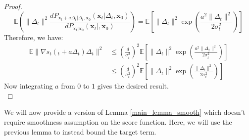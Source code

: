 \documentclass[11pt]{article}
\def\rvx{{\mathbf{x}}}
\begin{document}
\begin{proof}
\[
\mathbb{E}\left( \|\Delta_t\|^2\frac{d P_{\rvx_t+a\Delta_t|\Delta_t,\rvx_0}(\rvx_t|\Delta_t,\rvx_0)}{d P_{\rvx_t|\rvx_0}(\rvx_t|,\rvx_0)} \right) = \mathbb{E}\left[\|\Delta_t\|^2\exp\left(\frac{a^2\|\Delta_t\|^2}{2\sigma_t^2}\right)\right] 
\]
Therefore, we have:
\begin{align*}
\mathbb{E}\|\nabla s_t(_t+a\Delta_t)\Delta_t\|^2 &\leq \left(\frac{d}{\sigma_t^2}\right)^2 \mathbb{E}\left[\|\Delta_t\|^2\exp\left(\frac{a^2\|\Delta_t\|^2}{2\sigma_t^2}\right)\right]\\
& \leq \left(\frac{d}{\sigma_t^2}\right)^2 \mathbb{E}\left[\|\Delta_t\|^2\exp\left(\frac{\|\Delta_t\|^2}{2\sigma_t^2}\right)\right]
\end{align*}
Now integrating $a$ from $0$ to $1$ gives the desired result. \\
\end{proof}

\noindent
We will now provide a version of Lemma \ref{main_lemma_smooth} which doesn't require smoothness assumption on the score function. Here, we will use the previous lemma to instead bound the target term. \\
\end{document}
